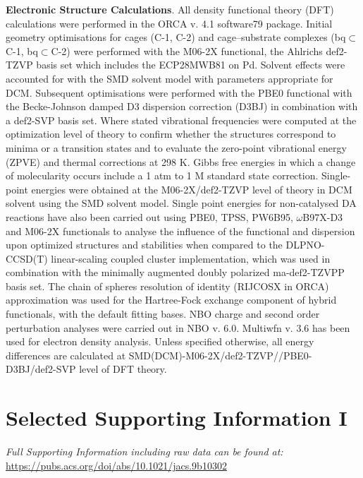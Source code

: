 \documentclass[../../main.tex]{subfiles}
\begin{document}
{\bfseries{Electronic Structure Calculations}}. All density functional theory (DFT) calculations were performed in the ORCA v. 4.1 software79 package. Initial geometry optimisations for cages (C-1, C-2) and cage–substrate complexes (bq$\subset$C-1, bq$\subset$C-2) were performed with the M06-2X functional,\cite{Zhao2007} the Ahlrichs def2-TZVP\cite{Weigend2005, Weigend2006} basis set which includes the ECP28MWB81 on Pd. Solvent effects were accounted for with the SMD\cite{Marenich2009} solvent model with parameters appropriate for DCM. Subsequent optimisations were performed with the PBE0\cite{Adamo1999} functional with the Becke-Johnson damped D3 dispersion correction (D3BJ)\cite{Johnson2006} in combination with a def2-SVP basis set. Where stated vibrational frequencies were computed at the optimization level of theory to confirm whether the structures correspond to minima or a transition states and to evaluate the zero-point vibrational energy (ZPVE) and thermal corrections at 298 K. Gibbs free energies in which a change of molecularity occurs include a 1 atm to 1 M standard state correction. 
Single-point energies were obtained at the M06-2X/def2-TZVP level of theory in DCM solvent using the SMD solvent model. Single point energies for non-catalysed DA reactions have also been carried out using PBE0,\cite{Adamo1999} TPSS,\cite{TPSS} PW6B95,\cite{Zhao2005} $\omega$B97X-D3\cite{Chai2008} and M06-2X\cite{Zhao2007} functionals to analyse the influence of the functional and dispersion upon optimized structures and stabilities when compared to the DLPNO-CCSD(T)\cite{Riplinger2016} linear-scaling coupled cluster implementation, which was used in combination with the minimally augmented doubly polarized ma-def2-TZVPP basis set. The chain of spheres resolution of identity (RIJCOSX in ORCA) approximation was used for the Hartree-Fock exchange component of hybrid functionals, with the default fitting bases. NBO charge and second order perturbation analyses were carried out in NBO\cite{Glendening2013} v. 6.0. Multiwfn v. 3.6\cite{Lu2011} has been used for electron density analysis. Unless specified otherwise, all energy differences are calculated at SMD(DCM)-M06-2X/def2-TZVP//PBE0-D3BJ/def2-SVP level of DFT theory.


\clearpage
\section{Selected Supporting Information I}
\emph{Full Supporting Information including raw data can be found at:}\\ {\url{https://pubs.acs.org/doi/abs/10.1021/jacs.9b10302}}
\end{document}
